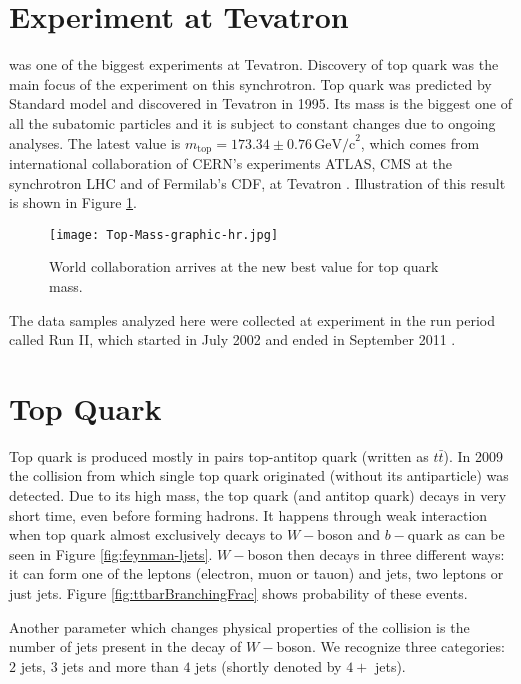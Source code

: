 \section{\texorpdfstring{\dzero}{D0} Experiment at Tevatron}
\dzero was one of the biggest experiments at Tevatron. Discovery of top quark was the main focus of the \dzero experiment on this synchrotron. Top quark was predicted by Standard model and discovered in Tevatron in 1995. Its mass is the biggest one of all the subatomic particles and it is subject to constant changes due to ongoing analyses. The latest value is $m_\mathrm{top} = 173.34 \pm 0.76 \,\mathrm{GeV/c}^2 $, which comes from international collaboration of CERN's experiments ATLAS, CMS at the synchrotron LHC and of Fermilab's CDF, \dzero at Tevatron \cite{jointMass}. Illustration of this result is shown in Figure \ref{fig:jointMass}. 

\begin{figure}[h]
	\centering
	\texttt{[image: Top-Mass-graphic-hr.jpg]}
	\caption{World collaboration arrives at the new best value for top quark mass.}
	\label{fig:jointMass}
\end{figure}

The data samples analyzed here were collected at \dzero experiment in the run period called Run II, which started in July 2002 and ended in September 2011 \cite{Yuntse}.

\section{Top Quark} \label{sec:topQuark}
Top quark is produced mostly in pairs top-antitop quark (written as $t\bar{t}$). In 2009 the collision from which single top quark originated  (without its antiparticle) was detected. Due to its high mass, the top quark (and antitop quark) decays in very short time, even before forming hadrons. It happens through weak interaction when top quark almost exclusively decays to $W-$boson and $b-$quark as can be seen in Figure \ref{fig:feynman-ljets}. $W-$boson then decays in three different ways: it can form one of the leptons (electron, muon or tauon) and jets, two leptons or just jets. Figure \ref{fig:ttbarBranchingFrac} shows probability of these events. 

Another parameter which changes physical properties of the collision is the number of jets present in the decay of $W-$boson. We recognize three categories: $2$ jets, $3$ jets and more than $4$ jets (shortly denoted by $4+$ jets).

